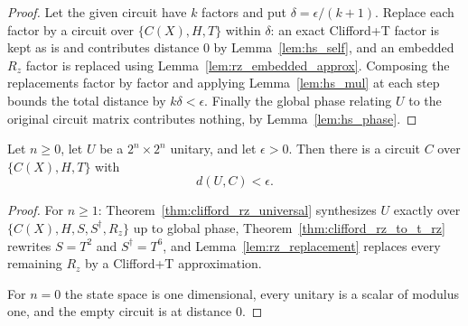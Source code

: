 \begin{proof}
  \leanok
  Let the given circuit have $k$ factors and put $\delta = \epsilon/(k+1)$.
  Replace each factor by a circuit over $\{C(X),H,T\}$ within $\delta$: an
  exact Clifford+T factor is kept as is and contributes distance $0$ by
  Lemma~\ref{lem:hs_self}, and an embedded $R_z$ factor is replaced using
  Lemma~\ref{lem:rz_embedded_approx}.  Composing the replacements factor by
  factor and applying Lemma~\ref{lem:hs_mul} at each step bounds the total
  distance by $k\delta < \epsilon$.  Finally the global phase relating $U$ to
  the original circuit matrix contributes nothing, by
  Lemma~\ref{lem:hs_phase}.
\end{proof}

\begin{theorem}
  \label{thm:clifford_t_universal}
  \leanok
  Let $n \ge 0$, let $U$ be a $2^n \times 2^n$ unitary, and let $\epsilon > 0$.
  Then there is a circuit $C$ over $\{C(X), H, T\}$ with
  \[
    d(U, C) < \epsilon .
  \]
\end{theorem}

\begin{proof}
  \leanok
  For $n \ge 1$: Theorem~\ref{thm:clifford_rz_universal} synthesizes $U$
  exactly over $\{C(X),H,S,S^\dagger,R_z\}$ up to global phase,
  Theorem~\ref{thm:clifford_rz_to_t_rz} rewrites $S = T^2$ and
  $S^\dagger = T^6$, and Lemma~\ref{lem:rz_replacement} replaces every
  remaining $R_z$ by a Clifford+T approximation.

  For $n = 0$ the state space is one dimensional, every unitary is a scalar of
  modulus one, and the empty circuit is at distance $0$.
\end{proof}
